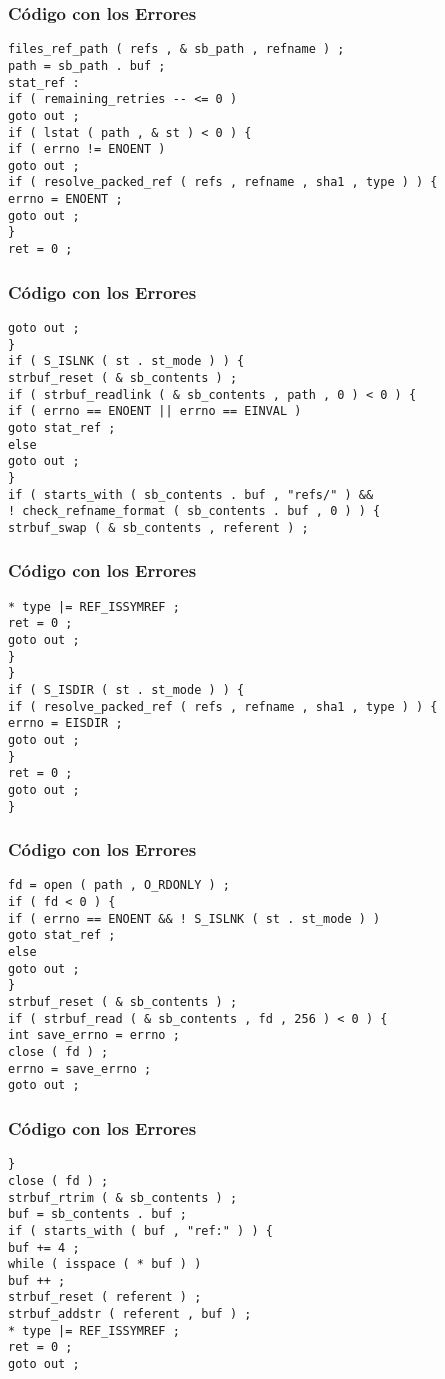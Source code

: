 \documentclass{beamer}
\begin{document}
\begin{frame}[fragile]
\frametitle{C\'odigo con los Errores}
\begin{verbatim}
files_ref_path ( refs , & sb_path , refname ) ; 
path = sb_path . buf ; 
stat_ref : 
if ( remaining_retries -- <= 0 ) 
goto out ; 
if ( lstat ( path , & st ) < 0 ) { 
if ( errno != ENOENT ) 
goto out ; 
if ( resolve_packed_ref ( refs , refname , sha1 , type ) ) { 
errno = ENOENT ; 
goto out ; 
} 
ret = 0 ; 
\end{verbatim}
\end{frame}
\begin{frame}[fragile]
\frametitle{C\'odigo con los Errores}
\begin{verbatim}
goto out ; 
} 
if ( S_ISLNK ( st . st_mode ) ) { 
strbuf_reset ( & sb_contents ) ; 
if ( strbuf_readlink ( & sb_contents , path , 0 ) < 0 ) { 
if ( errno == ENOENT || errno == EINVAL ) 
goto stat_ref ; 
else 
goto out ; 
} 
if ( starts_with ( sb_contents . buf , "refs/" ) && 
! check_refname_format ( sb_contents . buf , 0 ) ) { 
strbuf_swap ( & sb_contents , referent ) ; 
\end{verbatim}
\end{frame}
\begin{frame}[fragile]
\frametitle{C\'odigo con los Errores}
\begin{verbatim}
* type |= REF_ISSYMREF ; 
ret = 0 ; 
goto out ; 
} 
} 
if ( S_ISDIR ( st . st_mode ) ) { 
if ( resolve_packed_ref ( refs , refname , sha1 , type ) ) { 
errno = EISDIR ; 
goto out ; 
} 
ret = 0 ; 
goto out ; 
} 
\end{verbatim}
\end{frame}
\begin{frame}[fragile]
\frametitle{C\'odigo con los Errores}
\begin{verbatim}
fd = open ( path , O_RDONLY ) ; 
if ( fd < 0 ) { 
if ( errno == ENOENT && ! S_ISLNK ( st . st_mode ) ) 
goto stat_ref ; 
else 
goto out ; 
} 
strbuf_reset ( & sb_contents ) ; 
if ( strbuf_read ( & sb_contents , fd , 256 ) < 0 ) { 
int save_errno = errno ; 
close ( fd ) ; 
errno = save_errno ; 
goto out ; 
\end{verbatim}
\end{frame}
\begin{frame}[fragile]
\frametitle{C\'odigo con los Errores}
\begin{verbatim}
} 
close ( fd ) ; 
strbuf_rtrim ( & sb_contents ) ; 
buf = sb_contents . buf ; 
if ( starts_with ( buf , "ref:" ) ) { 
buf += 4 ; 
while ( isspace ( * buf ) ) 
buf ++ ; 
strbuf_reset ( referent ) ; 
strbuf_addstr ( referent , buf ) ; 
* type |= REF_ISSYMREF ; 
ret = 0 ; 
goto out ; 
\end{verbatim}
\end{frame}
\end{document}
